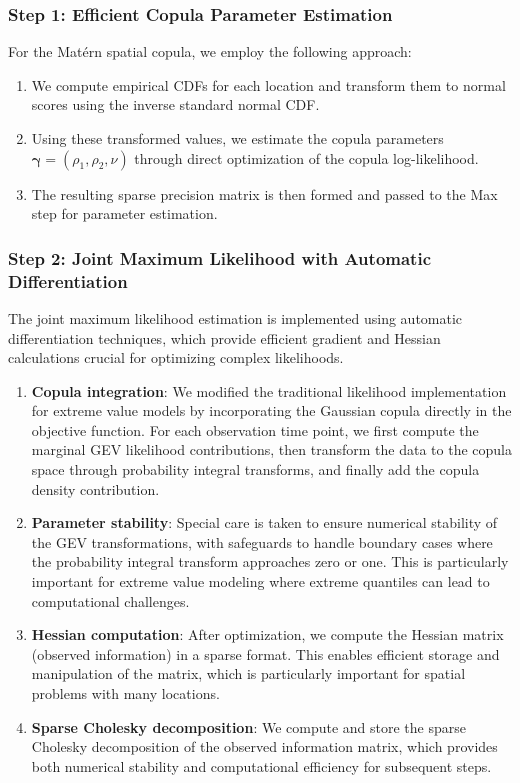 \subsubsection{Step 1: Efficient Copula Parameter Estimation}
For the Matérn spatial copula, we employ the following approach:

\begin{enumerate}
    \item We compute empirical CDFs for each location and transform them to normal scores using the inverse standard normal CDF.
    
    \item Using these transformed values, we estimate the copula parameters $\boldsymbol{\gamma} = (\rho_1, \rho_2, \nu)$ through direct optimization of the copula log-likelihood.
    
    \item The resulting sparse precision matrix is then formed and passed to the Max step for parameter estimation.
\end{enumerate}

\subsubsection{Step 2: Joint Maximum Likelihood with Automatic Differentiation}
The joint maximum likelihood estimation is implemented using automatic differentiation techniques, which provide efficient gradient and Hessian calculations crucial for optimizing complex likelihoods.

\begin{enumerate}
    \item \textbf{Copula integration}: We modified the traditional likelihood implementation for extreme value models by incorporating the Gaussian copula directly in the objective function. For each observation time point, we first compute the marginal GEV likelihood contributions, then transform the data to the copula space through probability integral transforms, and finally add the copula density contribution.
    
    \item \textbf{Parameter stability}: Special care is taken to ensure numerical stability of the GEV transformations, with safeguards to handle boundary cases where the probability integral transform approaches zero or one. This is particularly important for extreme value modeling where extreme quantiles can lead to computational challenges.
    
    \item \textbf{Hessian computation}: After optimization, we compute the Hessian matrix (observed information) in a sparse format. This enables efficient storage and manipulation of the matrix, which is particularly important for spatial problems with many locations.
    
    \item \textbf{Sparse Cholesky decomposition}: We compute and store the sparse Cholesky decomposition of the observed information matrix, which provides both numerical stability and computational efficiency for subsequent steps.
\end{enumerate}


